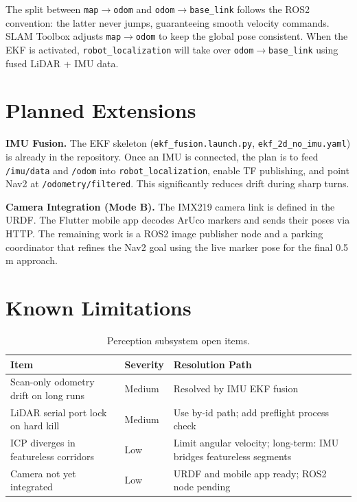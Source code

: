 \documentclass[12pt,a4paper]{report}
\begin{document}
The split between \texttt{map$\rightarrow$odom} and \texttt{odom$\rightarrow$base\_link} follows the ROS2 convention: the latter never jumps, guaranteeing smooth velocity commands. SLAM Toolbox adjusts \texttt{map$\rightarrow$odom} to keep the global pose consistent. When the EKF is activated, \texttt{robot\_localization} will take over \texttt{odom$\rightarrow$base\_link} using fused LiDAR + IMU data.

\section{Planned Extensions}

\textbf{IMU Fusion.} The EKF skeleton (\texttt{ekf\_fusion.launch.py}, \texttt{ekf\_2d\_no\_imu.yaml}) is already in the repository. Once an IMU is connected, the plan is to feed \texttt{/imu/data} and \texttt{/odom} into \texttt{robot\_localization}, enable TF publishing, and point Nav2 at \texttt{/odometry/filtered}. This significantly reduces drift during sharp turns.

\textbf{Camera Integration (Mode B).} The IMX219 camera link is defined in the URDF. The Flutter mobile app decodes ArUco markers and sends their poses via HTTP. The remaining work is a ROS2 image publisher node and a parking coordinator that refines the Nav2 goal using the live marker pose for the final 0.5 m approach.

\section{Known Limitations}

\begin{table}[H]
\centering
\caption{Perception subsystem open items.}
\label{tab:perc_limits}
\begin{tabularx}{\textwidth}{|p{3.5cm}|p{1.4cm}|X|}
\hline
\textbf{Item} & \textbf{Severity} & \textbf{Resolution Path} \\
\hline
Scan-only odometry drift on long runs & Medium & Resolved by IMU EKF fusion \\
\hline
LiDAR serial port lock on hard kill & Medium & Use by-id path; add preflight process check \\
\hline
ICP diverges in featureless corridors & Low & Limit angular velocity; long-term: IMU bridges featureless segments \\
\hline
Camera not yet integrated & Low & URDF and mobile app ready; ROS2 node pending \\
\hline
\end{tabularx}
\end{table}
\end{document}
